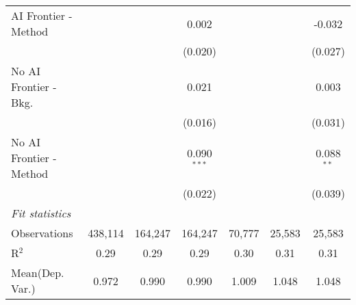 \begin{tabular}{lcccccc}
   AI Frontier - Method    &               &               & 0.002         &               &               & -0.032\\   
                           &               &               & (0.020)       &               &               & (0.027)\\   
   No AI Frontier - Bkg.   &               &               & 0.021         &               &               & 0.003\\   
                           &               &               & (0.016)       &               &               & (0.031)\\   
   No AI Frontier - Method &               &               & 0.090$^{***}$ &               &               & 0.088$^{**}$\\   
                           &               &               & (0.022)       &               &               & (0.039)\\   
   \midrule
   \emph{Fit statistics}\\
   Observations            & 438,114       & 164,247       & 164,247       & 70,777        & 25,583        & 25,583\\  
   R$^2$                   & 0.29          & 0.29          & 0.29          & 0.30          & 0.31          & 0.31\\  
Mean(Dep. Var.) & 0.972 & 0.990 & 0.990 & 1.009 & 1.048 & 1.048 \\
   

\end{tabular}

